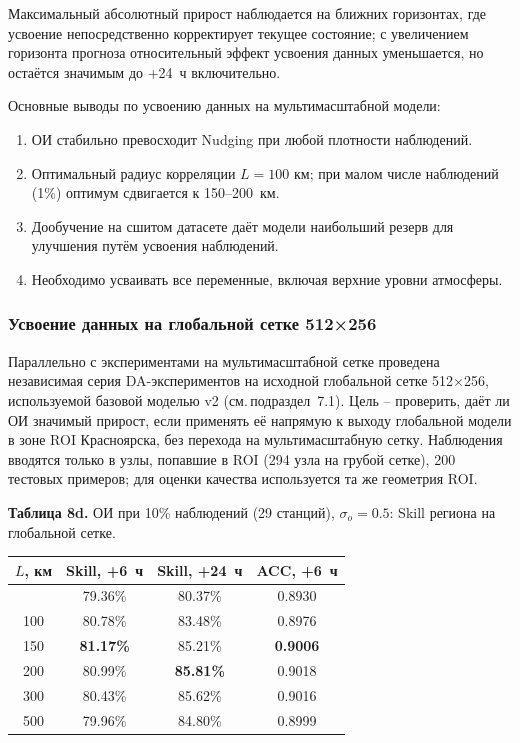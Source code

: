 \documentclass[14pt,a4paper]{extarticle}
\newcounter{none}
\numberwithin{table}{section}
\numberwithin{figure}{section}
\numberwithin{equation}{section}
\providecommand{\tightlist}{%
  \setlength{\itemsep}{0pt}\setlength{\parskip}{0pt}}
\begin{document}
Максимальный абсолютный прирост наблюдается на ближних горизонтах,
где усвоение непосредственно корректирует текущее состояние; с
увеличением горизонта прогноза относительный эффект усвоения данных
уменьшается, но остаётся значимым до +24~ч включительно.

Основные выводы по усвоению данных на мультимасштабной модели:
\begin{enumerate}
\def\labelenumi{\arabic{enumi}.}
\tightlist
\item ОИ стабильно превосходит Nudging при любой плотности наблюдений.
\item Оптимальный радиус корреляции \(L = 100\) км; при малом числе
  наблюдений (1\%) оптимум сдвигается к 150--200~км.
\item Дообучение на сшитом датасете даёт модели наибольший резерв для
  улучшения путём усвоения наблюдений.
\item Необходимо усваивать все переменные, включая верхние уровни
  атмосферы.
\end{enumerate}

\subsubsection{Усвоение данных на глобальной сетке 512×256}\label{ux443ux441ux432ux43eux435ux43dux438ux435-ux43dux430-ux433ux43bux43eux431ux430ux43bux44cux43dux43eux439-ux441ux435ux442ux43aux435}

Параллельно с экспериментами на мультимасштабной сетке проведена
независимая серия DA-экспериментов на исходной глобальной сетке
512$\times$256, используемой базовой моделью v2 (см.\,подраздел~7.1). Цель -- проверить, даёт ли
ОИ значимый прирост, если применять её напрямую к выходу глобальной
модели в зоне ROI Красноярска, без перехода на мультимасштабную
сетку. Наблюдения вводятся только в узлы, попавшие в ROI
(294 узла на грубой сетке), 200 тестовых примеров; для оценки
качества используется та же геометрия ROI.

\textbf{Таблица 8d.} ОИ при 10\% наблюдений (29 станций),
$\sigma_o = 0.5$: Skill региона на глобальной сетке.

{\def\LTcaptype{none}
\begin{longtable}[]{@{}cccc@{}}
\toprule\noalign{}
$L$, км & Skill, +6~ч & Skill, +24~ч & ACC, +6~ч \\
\midrule\noalign{}
\endhead
\bottomrule\noalign{}
\endlastfoot
50  & 79.36\% & 80.37\% & 0.8930 \\
100 & 80.78\% & 83.48\% & 0.8976 \\
150 & \textbf{81.17\%} & 85.21\% & \textbf{0.9006} \\
200 & 80.99\% & \textbf{85.81\%} & 0.9018 \\
300 & 80.43\% & 85.62\% & 0.9016 \\
500 & 79.96\% & 84.80\% & 0.8999 \\
\end{longtable}
}
\end{document}
